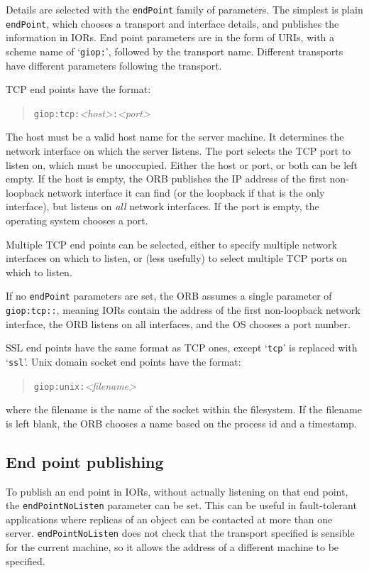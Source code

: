 \documentclass[11pt,twoside,a4paper]{book}
\newcommand{\code}[1]{\texttt{#1}}
\begin{document}
Details are selected with the \code{endPoint} family of parameters.
The simplest is plain \code{endPoint}, which chooses a transport and
interface details, and publishes the information in IORs. End point
parameters are in the form of URIs, with a scheme name of
`\code{giop:}', followed by the transport name. Different transports
have different parameters following the transport.

TCP end points have the format:

\begin{quote}
\code{giop:tcp:}\textit{<host>}\code{:}\textit{<port>}
\end{quote}

\noindent The host must be a valid host name for the server machine.
It determines the network interface on which the server listens. The
port selects the TCP port to listen on, which must be unoccupied.
Either the host or port, or both can be left empty. If the host is
empty, the ORB publishes the IP address of the first non-loopback
network interface it can find (or the loopback if that is the only
interface), but listens on \emph{all} network interfaces. If the port
is empty, the operating system chooses a port.

Multiple TCP end points can be selected, either to specify multiple
network interfaces on which to listen, or (less usefully) to select
multiple TCP ports on which to listen.

If no \code{endPoint} parameters are set, the ORB assumes a single
parameter of \code{giop:tcp::}, meaning IORs contain the address of
the first non-loopback network interface, the ORB listens on all
interfaces, and the OS chooses a port number.

SSL end points have the same format as TCP ones, except `\code{tcp}'
is replaced with `\code{ssl}'. Unix domain socket end points have the
format:

\begin{quote}
\code{giop:unix:}\textit{<filename>}
\end{quote}

\noindent where the filename is the name of the socket within the
filesystem. If the filename is left blank, the ORB chooses a name
based on the process id and a timestamp.


\subsection{End point publishing}

To publish an end point in IORs, without actually listening on that
end point, the \code{endPointNoListen} parameter can be set. This can
be useful in fault-tolerant applications where replicas of an object
can be contacted at more than one server. \code{endPointNoListen} does
not check that the transport specified is sensible for the current
machine, so it allows the address of a different machine to be
specified.
\end{document}
